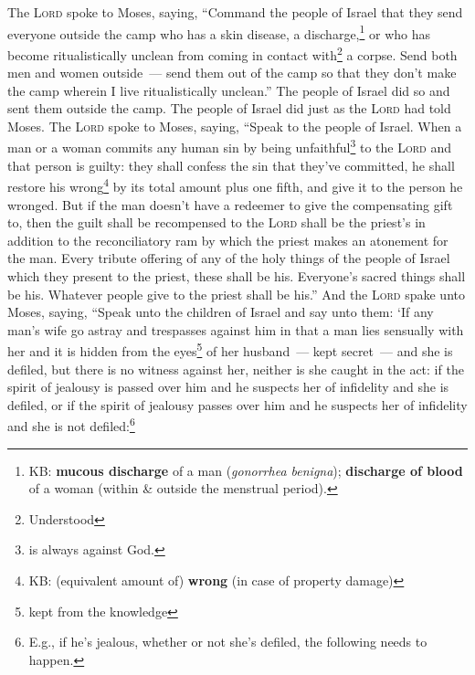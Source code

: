 
\begin{inparaenum}
     The \textsc{Lord} spoke to Moses, saying,%
     ``Command the people of Israel that they send everyone outside the camp who has a skin disease, a discharge,\footnote{KB: \textbf{mucous discharge} of a man (\textit{gonorrhea benigna}); \textbf{discharge of blood} of a woman (within \& outside the menstrual period).} or who has become ritualistically unclean from coming in contact with\footnote{Understood} a corpse.%
     Send both men and women outside~--- send them out of the camp so that they don't make the camp wherein I live ritualistically unclean.''%
     The people of Israel did so and sent them outside the camp. The people of Israel did just as the \textsc{Lord} had told Moses.%
     The \textsc{Lord} spoke to Moses, saying,%
     ``Speak to the people of Israel. When a man or a woman commits any human sin by being unfaithful\footnote{ is always against God.} to the \textsc{Lord} and that person is guilty:%
     they shall confess the sin that they've committed, he shall restore his wrong\footnote{KB: (equivalent amount of) \textbf{wrong} (in case of property damage)} by its total amount plus one fifth, and give it to the person he wronged.%
     But if the man doesn't have a redeemer to give the compensating gift to, then the guilt shall be recompensed to the \textsc{Lord} shall be the priest's in addition to the reconciliatory ram by which the priest makes an atonement for the man.%
     Every tribute offering of any of the holy things of the people of Israel which they present to the priest, these shall be his.%
     Everyone's sacred things shall be his. Whatever people give to the priest shall be his.''%
     And the \textsc{Lord} spake unto Moses, saying,%
     ``Speak unto the children of Israel and say unto them: `If any man's wife go astray and trespasses against him%
     in that a man lies sensually with her and it is hidden from the eyes\footnote{kept from the knowledge} of her husband~--- kept secret~--- and she is defiled, but there is no witness against her, neither is she caught in the act:%
     if the spirit of jealousy is passed over him and he suspects her of infidelity and she is defiled, or if the spirit of jealousy passes over him and he suspects her of infidelity and she is not defiled:\footnote{E.g., if he's jealous, whether or not she's defiled, the following needs to happen.}%

\end{inparaenum}

